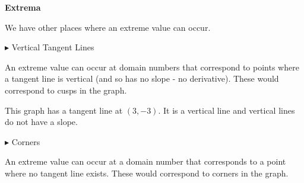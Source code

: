 \documentclass{ximera}
\begin{document}
\begin{template} \textbf{\textcolor{blue!55!black}{Extrema}} 

We have other places where an extreme value can occur. 


\textbf{\textcolor{red!70!darkgray}{$\blacktriangleright$}} Vertical Tangent Lines 

An extreme value can occur at domain numbers that correspond to points where a tangent line is vertical (and so has no slope - no derivative).  These would correspond to cusps in the graph. 









\begin{image}
\end{image}


This graph has a tangent line at $(3, -3)$.  It is a vertical line and vertical lines do not have a slope. 









\textbf{\textcolor{red!70!darkgray}{$\blacktriangleright$}} Corners 

An extreme value can occur at a domain number that corresponds to a point where no tangent line exists.  These would correspond to corners in the graph. 










\end{template}
\end{document}
